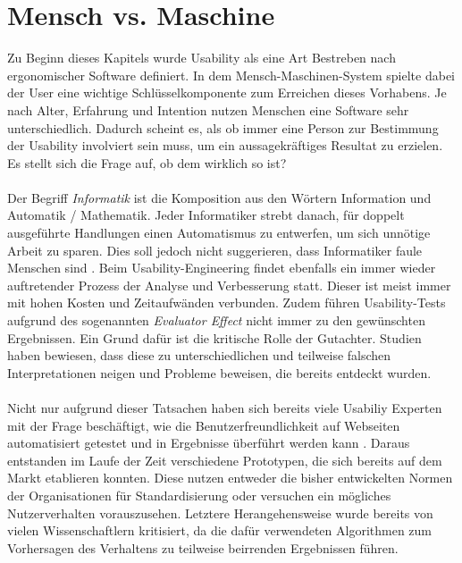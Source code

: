 %
%
%
%

\section{Mensch vs. Maschine}

Zu Beginn dieses Kapitels wurde Usability als eine Art Bestreben nach ergonomischer Software definiert. In dem Mensch-Maschinen-System spielte dabei der User eine wichtige Schlüsselkomponente zum Erreichen dieses Vorhabens. Je nach Alter, Erfahrung und Intention nutzen Menschen eine Software sehr unterschiedlich. Dadurch scheint es, als ob immer eine Person zur Bestimmung der Usability involviert sein muss, um ein aussagekräftiges Resultat zu erzielen. Es stellt sich die Frage auf, ob dem wirklich so ist?\\
\\
Der Begriff \textit{Informatik} ist die Komposition aus den Wörtern Information und Automatik / Mathematik. Jeder Informatiker strebt danach, für doppelt ausgeführte Handlungen einen Automatismus zu entwerfen, um sich unnötige Arbeit zu sparen. Dies soll jedoch nicht suggerieren, dass Informatiker faule Menschen sind \cite{lazy}. Beim Usability-Engineering findet ebenfalls ein immer wieder auftretender Prozess der Analyse und Verbesserung statt. Dieser ist meist immer mit hohen Kosten und Zeitaufwänden verbunden. Zudem führen Usability-Tests aufgrund des sogenannten \textit{\glqq Evaluator Effect\grqq{}} \cite{anzahlTestpersonen} nicht immer zu den gewünschten Ergebnissen. Ein Grund dafür ist die kritische Rolle der Gutachter. Studien haben bewiesen, dass diese zu unterschiedlichen und teilweise falschen Interpretationen neigen und Probleme beweisen, die bereits entdeckt wurden.\\
\\
Nicht nur aufgrund dieser Tatsachen haben sich bereits viele Usabiliy Experten mit der Frage beschäftigt, wie die Benutzerfreundlichkeit auf Webseiten automatisiert getestet und in Ergebnisse überführt werden kann \cite{automatisierteUsabilityTests}. Daraus entstanden im Laufe der Zeit verschiedene Prototypen, die sich bereits auf dem Markt etablieren konnten. Diese nutzen entweder die bisher entwickelten Normen der Organisationen für Standardisierung oder versuchen ein mögliches Nutzerverhalten vorauszusehen. Letztere Herangehensweise wurde bereits von vielen Wissenschaftlern kritisiert, da die dafür verwendeten Algorithmen zum Vorhersagen des Verhaltens zu teilweise beirrenden Ergebnissen führen.\\
